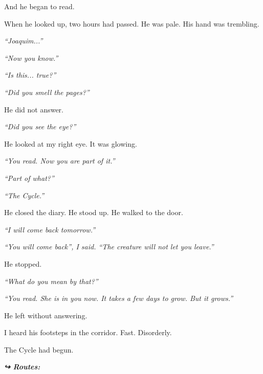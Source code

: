 \noindent And he began to read.

\noindent When he looked up, two hours had passed. He was pale. His hand was trembling.

\noindent \textit{\textquotedblleft{}Joaquim...\textquotedblright{}}

\noindent \textit{\textquotedblleft{}Now you know.\textquotedblright{}}

\noindent \textit{\textquotedblleft{}Is this... true?\textquotedblright{}}

\noindent \textit{\textquotedblleft{}Did you smell the pages?\textquotedblright{}}

\noindent He did not answer.

\noindent \textit{\textquotedblleft{}Did you see the eye?\textquotedblright{}}

\noindent He looked at my right eye. It was glowing.

\noindent \textit{\textquotedblleft{}You read. Now you are part of it.\textquotedblright{}}

\noindent \textit{\textquotedblleft{}Part of what?\textquotedblright{}}

\noindent \textit{\textquotedblleft{}The Cycle.\textquotedblright{}}

\noindent He closed the diary. He stood up. He walked to the door.

\noindent \textit{\textquotedblleft{}I will come back tomorrow.\textquotedblright{}}

\noindent \textit{\textquotedblleft{}You will come back\textquotedblright{}\textit{, I said. }\textquotedblleft{}The creature will not let you leave.\textquotedblright{}}

\noindent He stopped.

\noindent \textit{\textquotedblleft{}What do you mean by that?\textquotedblright{}}

\noindent \textit{\textquotedblleft{}You read. She is in you now. It takes a few days to grow. But it grows.\textquotedblright{}}

\noindent He left without answering.

\noindent I heard his footsteps in the corridor. Fast. Disorderly.

\noindent The Cycle had begun.

\vspace{0.5em}
\noindent\textit{\textbf{↪ Routes:}  \rotasep {} \rotasep {}}

